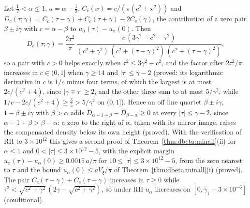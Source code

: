 \begin{remark}\label{qrh:rem:pairs}
Let $\frac12<\alpha\le1$, $a=\alpha-\frac12$, $C_c(x)=c/(\pi(c^2+x^2))$ and $D_c(\tau;\gamma)=C_c(\tau-\gamma)+C_c(\tau+\gamma)-2C_c(\gamma)$, the contribution of a zero pair $\beta\pm i\gamma$ with $c=\alpha-\beta$ to $u_\alpha(\tau)-u_\alpha(0)$. Then
\[
D_c(\tau;\gamma)=\frac{2\tau^2}\pi\,\frac{c\,(3\gamma^2-c^2-\tau^2)}{(c^2+\gamma^2)\,(c^2+(\tau-\gamma)^2)\,(c^2+(\tau+\gamma)^2)},
\]
so a pair with $c>0$ helps exactly when $\tau^2\le3\gamma^2-c^2$, and the factor after $2\tau^2/\pi$ increases in $c\in(0,1]$ when $\gamma\ge14$ and $|\tau|\le\gamma-2$ (proved: its logarithmic derivative in $c$ is $1/c$ minus four terms, of which the largest is at most $2c/(c^2+4)$, since $|\gamma\mp\tau|\ge2$, and the other three sum to at most $5/\gamma^2$, while $1/c-2c/(c^2+4)\ge\frac35>5/\gamma^2$ on $(0,1]$). Hence an off line quartet $\beta\pm i\gamma$, $1-\beta\pm i\gamma$ with $\beta>\alpha$ adds $D_{\alpha-1+\beta}-D_{\beta-\alpha}\ge0$ at every $|\tau|\le\gamma-2$, since $\alpha-1+\beta>\beta-\alpha$: a zero to the right of $\alpha$, taken with its mirror image, raises the compensated density below its own height (proved). With the verification of RH to $3\times10^{12}$ \cite{PT21} this gives a second proof of Theorem~\ref{thm:dbeta:minall}(ii) for $\alpha\le1$ and $0<|\tau|\le3\times10^{12}-5$, with the explicit margin $u_\alpha(\tau)-u_\alpha(0)\ge0.0015\,a/\pi$ for $10\le|\tau|\le3\times10^{12}-5$, from the zero nearest to $\tau$ and the bound $u_\alpha(0)\le aV_\xi/\pi$ of Theorem~\ref{thm:dbeta:minall}(i) (proved). The pair $C_c(\tau-\gamma)+C_c(\tau+\gamma)$ increases in $\tau\ge0$ while $\tau^2<\sqrt{c^2+\gamma^2}\,(2\gamma-\sqrt{c^2+\gamma^2})$, so under RH $u_\alpha$ increases on $[0,\gamma_1-3\times10^{-6}]$ (conditional).


\end{remark}
